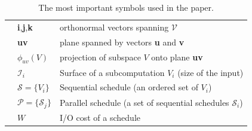 \documentclass[sigplan,review,anonymous]{acmart}\settopmatter{printfolios=true,printccs=false,printacmref=false}
\begin{document}
\begin{table}[h!]
\begin{tabular}{@{}l|ll@{}}
		& \textbf{i},\textbf{j},\textbf{k} & orthonormal 
		vectors spanning 
		$\mathcal{V}$\\
		& \textbf{uv} & plane spanned by vectors \textbf{u} 
		and \textbf{v}\\
		& $\phi_{uv}(V)$ & projection of subspace $V$ onto 
		plane \textbf{uv}\\
		& $\mathcal{I}_i$ & Surface of a subcomputation $V_i$ 
		(size of the 
		input)\\
		& $\mathcal{S} = \{V_i\}$ & Sequential schedule (an 
		ordered set of 
		$V_i$) \\ 
		& $\mathcal{P} = \{\mathcal{S}_j\}$ & Parallel 
		schedule (a set of 
		sequential schedules $\mathcal{S}_i$) \\
		& $W$ & I/O cost of a schedule \\
		\midrule
		
		\bottomrule
	\end{tabular}
	\caption{The most important symbols used in the paper.}
	\label{tab:symbols}
	\vspace{-0.5em}
\end{table}
\end{document}
